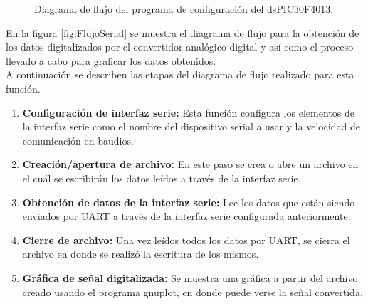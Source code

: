 	\begin{figure}[htbp!]
		\centering
		\caption{Diagrama de flujo del programa de configuración del dsPIC30F4013.}
		\label{fig:ConfiguracionMicro}
	\end{figure}

En la figura \ref{fig:FlujoSerial} se muestra el diagrama de flujo para la obtención de los datos digitalizados por el convertidor analógico digital y así como el proceso llevado a cabo para graficar los datos obtenidos.\\

A continuación se describen las etapas del diagrama de flujo realizado para esta función.
\begin{enumerate}
	\item \textbf{Configuración de interfaz serie:} Esta función configura los elementos de la interfaz serie como el nombre del dispositivo serial a usar y la velocidad de comunicación en baudios.
	\item \textbf{Creación/apertura de archivo:} En este paso se crea o abre un archivo en el cuál se escribirán los datos leídos a través de la interfaz serie.
	\item \textbf{Obtención de datos de la interfaz serie:} Lee los datos que están siendo enviados por UART a través de la interfaz serie configurada anteriormente.
	\item \textbf{Cierre de archivo:} Una vez leídos todos los datos por UART, se cierra el archivo en donde se realizó la escritura de los mismos.
	\item \textbf{Gráfica de señal digitalizada:} Se muestra una gráfica a partir del archivo creado usando el programa gnuplot, en donde puede verse la señal convertida.
\end{enumerate}

